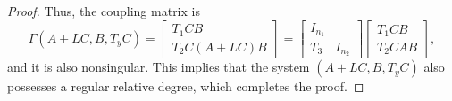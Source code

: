 \documentclass[10pt,a4paper]{amsart}
\newcommand\GAmma{\mathit\Gamma}
\begin{document}
\begin{proof}
Thus, the coupling matrix is
\[
\GAmma(A+LC,B,T_yC) = \begin{bmatrix}T_1CB \\ T_2C(A+LC)B\end{bmatrix} = \begin{bmatrix}I_{n_1} & \\ T_3 & I_{n_2}\end{bmatrix} \begin{bmatrix}T_1CB \\ T_2CAB\end{bmatrix},
\]
and it is also nonsingular. This implies that the system $(A+LC,B,T_yC)$ also possesses a regular relative degree, which completes the proof.
\end{proof}
\end{document}
